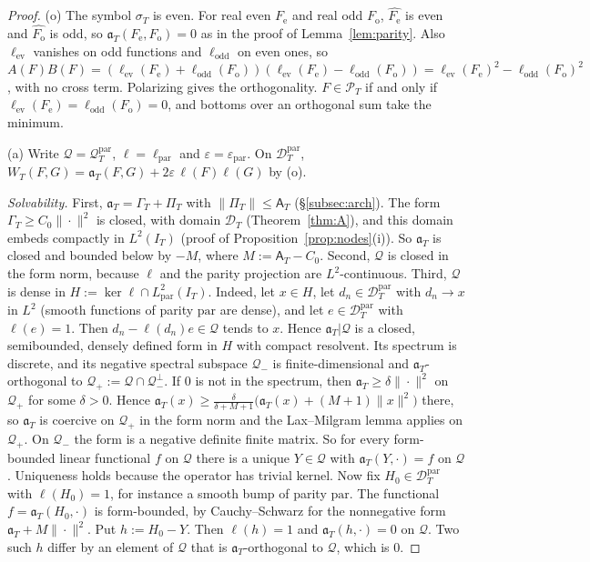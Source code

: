 \documentclass[11pt]{amsart}
\theoremstyle{definition}
\theoremstyle{remark}
\newcommand{\PT}{\mathcal P_T}
\newcommand{\IT}{I_T}
\newcommand{\sT}{\sigma_T}
\newcommand{\Aconst}{\mathsf A_T}
\newcommand{\PiT}{\Pi_T}
\begin{document}
\begin{proof}
(o) The symbol $\sT$ is even. For real even $F_{\mathrm e}$ and real odd $F_{\mathrm o}$, $\widehat{F_{\mathrm e}}$ is even and
$\widehat{F_{\mathrm o}}$ is odd, so $\mathfrak a_T(F_{\mathrm e},F_{\mathrm o})=0$ as in the proof of
Lemma~\ref{lem:parity}. Also $\ell_{\mathrm{ev}}$ vanishes on odd functions and $\ell_{\mathrm{odd}}$ on even ones, so
$A(F)B(F)=(\ell_{\mathrm{ev}}(F_{\mathrm e})+\ell_{\mathrm{odd}}(F_{\mathrm o}))(\ell_{\mathrm{ev}}(F_{\mathrm e})-\ell_{\mathrm{odd}}(F_{\mathrm o}))
=\ell_{\mathrm{ev}}(F_{\mathrm e})^2-\ell_{\mathrm{odd}}(F_{\mathrm o})^2$, with no cross term. Polarizing gives the
orthogonality. $F\in\PT$ if and only if $\ell_{\mathrm{ev}}(F_{\mathrm e})=\ell_{\mathrm{odd}}(F_{\mathrm o})=0$, and bottoms over an
orthogonal sum take the minimum.

(a) Write $\mathcal Q=\mathcal Q^{\mathrm{par}}_T$, $\ell=\ell_{\mathrm{par}}$ and $\varepsilon=\varepsilon_{\mathrm{par}}$. On
$\mathcal D^{\mathrm{par}}_T$, $W_T(F,G)=\mathfrak a_T(F,G)+2\varepsilon\,\ell(F)\ell(G)$ by (o).

\emph{Solvability.} First, $\mathfrak a_T=\Gamma_T+\PiT$ with $\|\PiT\|\le\Aconst$ (\S\ref{subsec:arch}). The form
$\Gamma_T\ge C_0\|\cdot\|^2$ is closed, with domain $\mathcal D_T$ (Theorem~\ref{thm:A}), and this domain embeds
compactly in $L^2(\IT)$ (proof of Proposition~\ref{prop:nodes}(i)). So $\mathfrak a_T$ is closed and bounded
below by $-M$, where $M:=\Aconst-C_0$. Second, $\mathcal Q$ is closed in the form norm, because $\ell$ and the
parity projection are $L^2$-continuous. Third, $\mathcal Q$ is dense in
$H:=\ker\ell\cap L^2_{\mathrm{par}}(\IT)$. Indeed, let $x\in H$, let $d_n\in\mathcal D^{\mathrm{par}}_T$ with $d_n\to x$ in
$L^2$ (smooth functions of parity $\mathrm{par}$ are dense), and let $e\in\mathcal D^{\mathrm{par}}_T$ with $\ell(e)=1$.
Then $d_n-\ell(d_n)e\in\mathcal Q$ tends to $x$. Hence $\mathfrak a_T|\mathcal Q$ is a closed, semibounded, densely
defined form in $H$ with compact resolvent. Its spectrum is discrete, and its negative spectral subspace
$\mathcal Q_-$ is finite-dimensional and $\mathfrak a_T$-orthogonal to $\mathcal Q_+:=\mathcal Q\cap\mathcal Q_-^\perp$. If
$0$ is not in the spectrum, then $\mathfrak a_T\ge\delta\|\cdot\|^2$ on $\mathcal Q_+$ for some $\delta>0$. Hence
$\mathfrak a_T(x)\ge\frac{\delta}{\delta+M+1}\big(\mathfrak a_T(x)+(M+1)\|x\|^2\big)$ there, so $\mathfrak a_T$ is coercive
on $\mathcal Q_+$ in the form norm and the Lax--Milgram lemma applies on $\mathcal Q_+$. On $\mathcal Q_-$ the form is a
negative definite finite matrix. So for every form-bounded linear functional $f$ on $\mathcal Q$ there is a unique
$Y\in\mathcal Q$ with $\mathfrak a_T(Y,\cdot)=f$ on $\mathcal Q$. Uniqueness holds because the operator has trivial
kernel. Now fix $H_0\in\mathcal D^{\mathrm{par}}_T$ with $\ell(H_0)=1$, for instance a smooth bump of parity
$\mathrm{par}$. The functional $f=\mathfrak a_T(H_0,\cdot)$ is form-bounded, by Cauchy--Schwarz for the nonnegative
form $\mathfrak a_T+M\|\cdot\|^2$. Put $h:=H_0-Y$. Then $\ell(h)=1$ and $\mathfrak a_T(h,\cdot)=0$ on $\mathcal Q$. Two such
$h$ differ by an element of $\mathcal Q$ that is $\mathfrak a_T$-orthogonal to $\mathcal Q$, which is $0$.


\end{proof}
\end{document}
